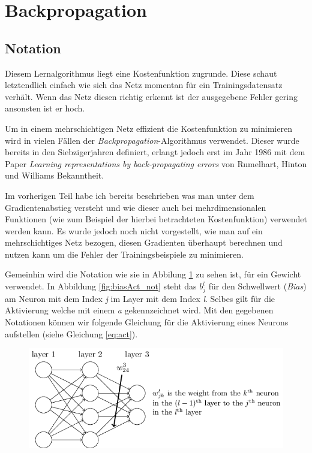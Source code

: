 \section{Backpropagation} \label{sec:backprop}

\subsection{Notation} \label{ss:notationBP}
Diesem Lernalgorithmus liegt eine Kostenfunktion zugrunde. Diese schaut letztendlich einfach wie sich das Netz momentan für ein Trainingsdatensatz verhält. Wenn das Netz diesen richtig erkennt ist der ausgegebene Fehler gering ansonsten ist er hoch. 

Um in einem mehrschichtigen Netz effizient die Kostenfunktion zu minimieren wird in vielen Fällen der \emph{Backpropagation}-Algorithmus verwendet. Dieser wurde bereits in den Siebzigerjahren definiert, erlangt jedoch erst im Jahr 1986 mit dem Paper \emph{Learning representations by back-propagating errors} von Rumelhart, Hinton und Williams Bekanntheit. 

Im vorherigen Teil habe ich bereits beschrieben was man unter dem Gradientenabstieg versteht und wie dieser auch bei mehrdimensionalen Funktionen (wie zum Beispiel der hierbei betrachteten Kostenfunktion) verwendet werden kann. Es wurde jedoch noch nicht vorgestellt, wie man auf ein mehrschichtiges Netz bezogen, diesen Gradienten überhaupt berechnen und nutzen kann um die Fehler der Trainingsbeispiele zu minimieren. 

Gemeinhin wird die Notation wie sie in Abbilung \ref{fig:weight_not} zu sehen ist, für ein Gewicht verwendet. In Abbildung \ref{fig:biasAct_not} steht das $b^l_j$ für den Schwellwert (\emph{Bias}) am Neuron mit dem Index \emph{j} im Layer mit dem Index \emph{l}. Selbes gilt für die Aktivierung welche mit einem \emph{a} gekennzeichnet wird. Mit den gegebenen Notationen können wir folgende Gleichung für die Aktivierung eines Neurons aufstellen (siehe Gleichung \ref{eq:act}). 

\begin{figure}[!htb]
	\centering
	\includegraphics[width=.9\linewidth]{img/weight_notation}
	\label{fig:weight_not}
\end{figure}

